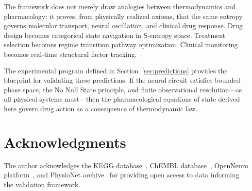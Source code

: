 \documentclass[twocolumn,10pt]{article}
\theoremstyle{remark}
\begin{document}
The framework does not merely draw analogies between thermodynamics and pharmacology: it proves, from physically realized axioms, that the same entropy governs molecular transport, neural oscillation, and clinical drug response. Drug design becomes categorical state navigation in S-entropy space. Treatment selection becomes regime transition pathway optimization. Clinical monitoring becomes real-time structural factor tracking.

The experimental program defined in Section~\ref{sec:predictions} provides the blueprint for validating these predictions. If the neural circuit satisfies bounded phase space, the No Null State principle, and finite observational resolution---as all physical systems must---then the pharmacological equations of state derived here govern drug action as a consequence of thermodynamic law.

\section*{Acknowledgments}

The author acknowledges the KEGG database~\citep{kanehisa2000kegg}, ChEMBL database~\citep{gaulton2012chembl}, OpenNeuro platform~\citep{markiewicz2021openneuro}, and PhysioNet archive~\citep{goldberger2000physiobank} for providing open access to data informing the validation framework.



\end{document}

